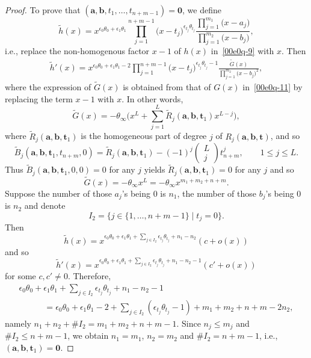 \documentclass[pdftex]{sigma}
\numberwithin{equation}{section}
\begin{document}
\begin{proof}
To prove that $(\boldsymbol a, \boldsymbol b, t_1,\dots,t_{n+m-1})=\boldsymbol 0$, we define
\begin{equation*}%
\widetilde{h}(x)=x^{\epsilon_0\theta_0+\epsilon_1\theta_1}\prod_{j=1}^{n+m-1}\bigl(x-t_j\bigr)^{\epsilon_{t_j}\theta_{t_j}}
\frac{\prod_{j=1}^{m_1}\bigl(x-a_j\bigr)}{\prod_{j=1}^{m_2}\bigl(x-b_j\bigr)},
\end{equation*}
i.e., replace the non-homogenous factor $x-1$ of $h(x)$ in~\eqref{00e0q-9} with $x$.
Then
\begin{align*}
\widetilde{h}'(x)=x^{\epsilon_0\theta_0+\epsilon_1\theta_1-2}\prod_{j=1}^{n+m-1}\bigl(x-t_j\bigr)^{\epsilon_{t_j}\theta_{t_j}-1}\frac{\widetilde{G}(x)}{\prod_{j=1}^{m_2}\bigl(x-b_j\bigr)^2},
\end{align*}
where the expression of $\widetilde{G}(x)$ is obtained from that of $G(x)$ in~\eqref{00e0q-11} by replacing the term $x-1$ with $x$. In other words,
\[\widetilde{G}(x)=-\theta_{\infty}\Bigg(x^{L}+\sum_{j=1}^{L}\widetilde{R}_j(\boldsymbol a,\boldsymbol b,\boldsymbol t_1)x^{L-j}\Bigg),\]
where $\widetilde{R}_j(\boldsymbol a,\boldsymbol b,\boldsymbol t_1)$
is the homogeneous part of degree $j$ of $R_j(\boldsymbol
a,\boldsymbol b,\boldsymbol t)$, and so
\[
\widetilde{B}_j(\boldsymbol a,\boldsymbol b,\boldsymbol t_1,t_{n+m},0)=\widetilde{R}_j(\boldsymbol a,\boldsymbol b,\boldsymbol t_1)-(-1)^j
\begin{pmatrix}L\\ j\end{pmatrix}t_{n+m}^j,\qquad 1\leq j\leq L.
\]
Thus $\widetilde{B}_j(\boldsymbol a,\boldsymbol b,\boldsymbol t_1,0,0)=0$ for any $j$ yields $\widetilde{R}_j(\boldsymbol a,\boldsymbol b,\boldsymbol t_1)=0$ for any $j$ and so
\[
\widetilde{G}(x)=-\theta_{\infty}x^{L}=-\theta_\infty x^{m_1+m_2+n+m}.
\]
Suppose the number of those $a_j$'s being $0$ is $n_1$, the number of those $b_j$'s being $0$ is $n_2$ and denote
\[
I_2=\{j\in \{1,\dots, n+m-1\} \mid t_j=0\}.
\]
Then
\[
\widetilde{h}(x)=x^{\epsilon_0\theta_0+\epsilon_1\theta_1+\sum_{j\in I_2}\epsilon_{t_j}\theta_{t_j}+n_1-n_2}(c+o(x))
\]
and so
\[
\widetilde{h}'(x)=x^{\epsilon_0\theta_0+\epsilon_1\theta_1+\sum_{j\in I_2}\epsilon_{t_j}\theta_{t_j}+n_1-n_2-1}(c'+o(x))
\]
for some $c, c'\neq 0$. Therefore,
\begin{gather*}
\epsilon_0\theta_0+\epsilon_1\theta_1+\sum_{j\in I_2}\epsilon_{t_j}\theta_{t_j}+n_1-n_2-1\\
\qquad\quad=\epsilon_0\theta_0+\epsilon_1\theta_1-2+\sum_{j\in I_2}(\epsilon_{t_j}\theta_{t_j}-1)+m_1+m_2+n+m-2n_2,
\end{gather*}
namely $n_1+n_2+\# I_2=m_1+m_2+n+m-1$. Since $n_j\leq m_j$ and $\#I_2\leq n+m-1$, we obtain $n_1=m_1$, $n_2=m_2$ and $\# I_2=n+m-1$, i.e., $(\boldsymbol a, \boldsymbol b, \boldsymbol t_1)=\boldsymbol 0$.


\end{proof}
\end{document}
